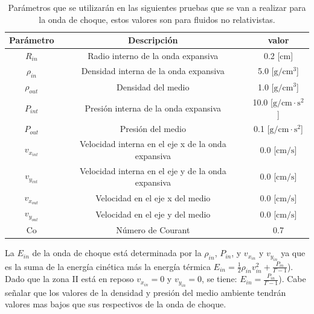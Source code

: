 \documentclass[12pt,a4paper]{book}
\begin{document}
\begin{table}[htbp]\label{Tabla_parametros}
\begin{center}
\begin{tabular}{|c|c|c|}
\hline 
\textbf{Parámetro} & \textbf{Descripción} & \textbf{valor} \\ 
\hline 
$R_{in}$ & Radio interno de la onda expansiva & 0.2 [cm] \\ 
\hline 
$\rho_{in}$ &  Densidad interna de la onda expansiva & 5.0 [$\mathrm{g} / \mathrm{cm}^3$] \\ 
\hline 
$\rho_{out}$ &  Densidad del medio  & 1.0 [$\mathrm{g} / \mathrm{cm}^3$] \\
\hline 
$P_{int}$ & Presión interna de la onda expansiva & 10.0 [$\mathrm{g}  /  \mathrm{cm}\cdot \mathrm{s}^2$]\\ 
\hline 
$P_{out}$ &  Presión del medio  & 0.1 [$\mathrm{g}  /  \mathrm{cm}\cdot \mathrm{s}^2$] \\ 
\hline 
$v_{x_{int}}$ & Velocidad interna en el eje x de la onda expansiva & 0.0 [$\mathrm{cm}/\mathrm{s}$]\\ 
\hline 
$v_{y_{int}}$ & Velocidad interna en el eje y de la onda expansiva & 0.0 [$\mathrm{cm}/\mathrm{s}$]\\ 
\hline 
$v_{x_{out}}$ & Velocidad en el eje x del medio & 0.0 [$\mathrm{cm}/\mathrm{s}$] \\
\hline 
$v_{y_{out}}$ & Velocidad en el eje y del medio & 0.0 [$\mathrm{cm}/\mathrm{s}$]\\ 
\hline 
Co & Número de Courant & 0.7 \\ 
\hline 
\end{tabular}
\caption{Parámetros que se utilizarán en las siguientes pruebas que se van a realizar para la onda de choque, estos valores son para fluidos no relativistas.}
\end{center}
\end{table}

La $E_{in}$ de la onda de choque está determinada por la $\rho_{in}$, $P_{in}$, y $v_{x_{in}}$ y $v_{y_{in}}$ ya que es la suma de la energía cinética más la energía térmica
$E_{in} = {\frac{1}{2}} \rho_{in} v_{in}^2 + {\frac{P_{in}}{\Gamma -1 }}$).
Dado que la zona II está en reposo $v_{x_{in}}=0$ y $v_{y_{in}}=0$, se tiene:
$E_{in} = {\frac{P_{in}}{\Gamma -1 }}$).
Cabe señalar que los valores de la densidad y presión del medio ambiente tendrán valores mas bajos que sus respectivos de la onda de choque. 
\end{document}

